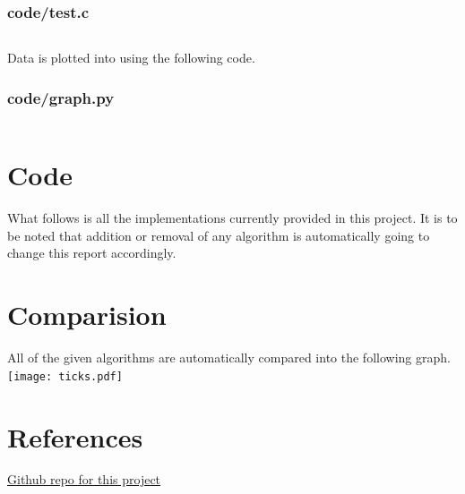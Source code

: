 \documentclass{article}
\begin{document}
\subsubsection*{code/test.c}
\inputminted{c}{code/test.c}
Data is plotted into using the following code.
\subsubsection*{code/graph.py}
\inputminted{python}{code/graph.py}
\section*{Code}
What follows is all the implementations currently provided in this project.
It is to be noted that addition or removal of any algorithm is automatically going to change this report accordingly.

\section*{Comparision}
All of the given algorithms are automatically compared into the following graph.\\
\texttt{[image: ticks.pdf]}
\section*{References}
\href{https://github.com/AritraGhosalatIEM/DAA-project}{Github repo for this project}
\end{document}
